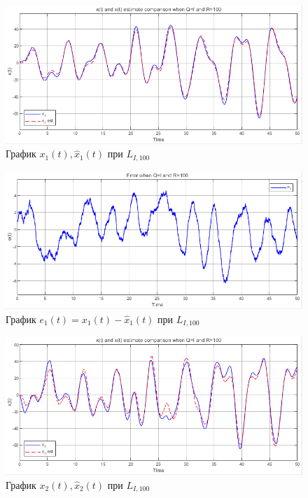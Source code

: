 \documentclass[a4paper, 12pt]{article}
\begin{document}
    \begin{figure}[H]
        \centering
        \includegraphics[scale=0.75]{2task_xxx1.png}
        \captionsetup{skip=0pt}
        \caption{График $x_1(t),\hat{x}_1(t)$ при $L_{I,100}$}
        \label{fig:2task_xxx1}
    \end{figure}
    \begin{figure}[H]
        \centering
        \includegraphics[scale=0.75]{2task_eee1.png}
        \captionsetup{skip=0pt}
        \caption{График $e_1(t)=x_1(t)-\hat{x}_1(t)$ при $L_{I,100}$}
        \label{fig:2task_eee1}
    \end{figure}
    \begin{figure}[H]
        \centering
        \includegraphics[scale=0.75]{2task_xxx2.png}
        \captionsetup{skip=0pt}
        \caption{График $x_2(t),\hat{x}_2(t)$ при $L_{I,100}$}
        \label{fig:2task_xxx2}
    \end{figure}
\end{document}
